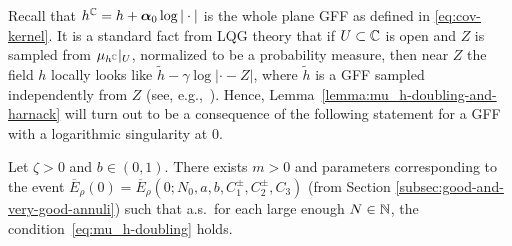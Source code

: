 \documentclass[12pt]{amsart}
\numberwithin{equation}{section}
\begin{document}
	Recall that $h^{\mathbb{C}} = h + \boldsymbol{\alpha}_0 \log |\cdot|$ is the whole plane GFF as defined in \eqref{eq:cov-kernel}. It is a standard fact from LQG theory that if $U\subset  \mathbb{C}$ is open and $Z$ is sampled from $\mu_{h^{\mathbb{C}}}|_U$, normalized to be a probability measure, then near $Z$ the field $h$ locally looks like $\tilde h - \gamma \log |\cdot-Z|$, where $\tilde h$ is a GFF sampled independently from $Z$ (see, e.g.,~\cite[Section 3.3]{duplantier2011liouville}). Hence, Lemma~\ref{lemma:mu_h-doubling-and-harnack} will turn out to be a consequence  of the following statement for a GFF with a logarithmic singularity at 0. 
	
	\begin{lemma} \label{lemma:doubling-alpha}
		Let $\zeta > 0$ and $b \in (0,1)$. There exists $m > 0$ and parameters corresponding to the event $\overline E_{\rho}(0) = \overline E_{\rho}(0; N_0, a, b, C_1^{\pm}, C_2^{\pm}, C_3)$ (from Section \ref{subsec:good-and-very-good-annuli}) such that a.s.\ for each large enough $N \in \mathbb{N}$, the condition~\eqref{eq:mu_h-doubling} holds.
	\end{lemma}
\end{document}
